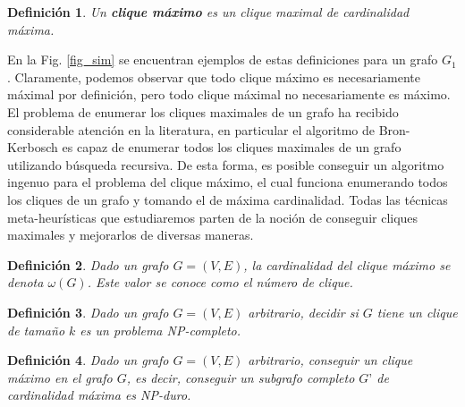 \documentclass[conference]{IEEEtran}
\newtheorem{mydef}{Definición}
\begin{document}
\begin{mydef}
  Un \textbf{clique máximo} es un clique maximal de cardinalidad máxima.
\end{mydef}

En la Fig. \ref{fig_sim} se encuentran ejemplos de estas definiciones
para un grafo $G_1$. Claramente, podemos observar que todo clique
máximo es necesariamente máximal por definición, pero todo clique
máximal no necesariamente es máximo. El problema de enumerar los
cliques maximales de un grafo ha recibido considerable atención en la
literatura, en particular el algoritmo de Bron-Kerbosch
\cite{Bron:1973:AFC:362342.362367} es capaz de enumerar todos los
cliques maximales de un grafo utilizando búsqueda recursiva. De esta
forma, es posible conseguir un algoritmo ingenuo para el problema del
clique máximo, el cual funciona enumerando todos los cliques de un
grafo y tomando el de máxima cardinalidad. Todas las técnicas
meta-heurísticas que estudiaremos parten de la noción de conseguir
cliques maximales y mejorarlos de diversas maneras.

\begin{mydef}
  Dado un grafo $G = (V, E)$, la cardinalidad del clique máximo se
  denota $\omega(G)$. Este valor se conoce como el número de clique.
\end{mydef}

\begin{mydef}
  Dado un grafo $G = (V,E)$ arbitrario, decidir si $G$ tiene un clique
  de tamaño $k$ es un problema \textsc{NP}-completo.
\end{mydef}

\begin{mydef}
  Dado un grafo $G = (V,E)$ arbitrario, conseguir un clique máximo en
  el grafo $G$, es decir, conseguir un subgrafo completo $G’$ de
  cardinalidad máxima es \textsc{NP}-duro.
\end{mydef}
\end{document}
